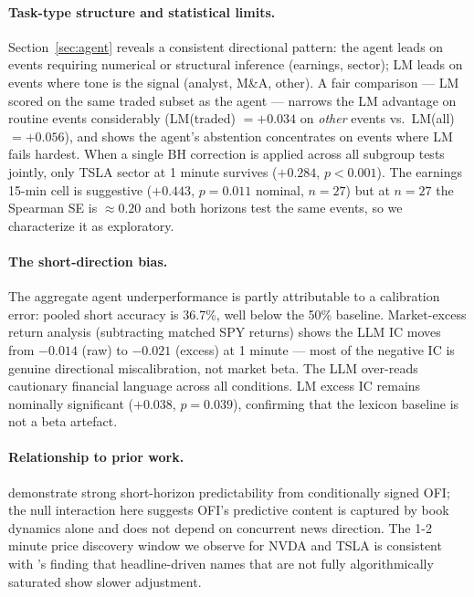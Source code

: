 \documentclass[11pt, letterpaper]{article}
\begin{document}
\paragraph{Task-type structure and statistical limits.} Section~\ref{sec:agent}
reveals a consistent directional pattern: the agent leads on events requiring
numerical or structural inference (earnings, sector); LM leads on events where tone
is the signal (analyst, M\&A, other). A fair comparison --- LM scored on the same
traded subset as the agent --- narrows the LM advantage on routine events considerably
(LM(traded) $= +0.034$ on \textit{other} events vs.\ LM(all) $= +0.056$), and shows
the agent's abstention concentrates on events where LM fails hardest. When a single
BH correction is applied across all subgroup tests jointly, only TSLA sector at 1
minute survives ($+0.284$, $p < 0.001$). The earnings 15-min cell is suggestive
($+0.443$, $p = 0.011$ nominal, $n = 27$) but at $n = 27$ the Spearman SE is $\approx
0.20$ and both horizons test the same events, so we characterize it as exploratory.

\paragraph{The short-direction bias.} The aggregate agent underperformance is partly
attributable to a calibration error: pooled short accuracy is 36.7\%, well below the
50\% baseline. Market-excess return analysis (subtracting matched SPY returns) shows
the LLM IC moves from $-0.014$ (raw) to $-0.021$ (excess) at 1 minute --- most of
the negative IC is genuine directional miscalibration, not market beta. The LLM
over-reads cautionary financial language across all conditions. LM excess IC remains
nominally significant ($+0.038$, $p = 0.039$), confirming that the lexicon baseline
is not a beta artefact.

\paragraph{Relationship to prior work.} \citet{lu2024trade} demonstrate strong
short-horizon predictability from conditionally signed OFI; the null interaction here
suggests OFI's predictive content is captured by book dynamics alone and does not
depend on concurrent news direction. The 1-2 minute price discovery window we observe
for NVDA and TSLA is consistent with \citet{grossklussmann2011machines}'s finding that
headline-driven names that are not fully algorithmically saturated show slower adjustment.
\end{document}
